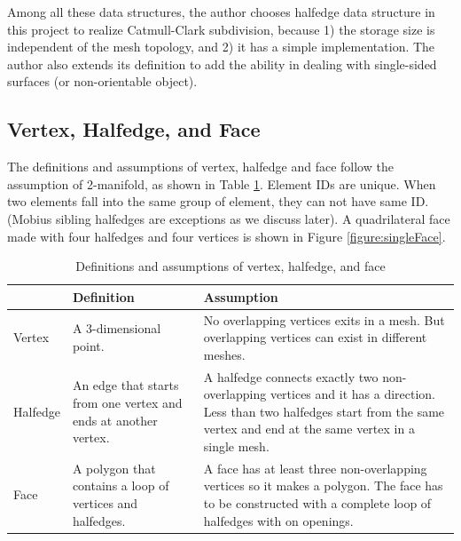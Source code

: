 \documentclass[12pt]{article}
\begin{document}
Among all these data structures, the author chooses halfedge data structure in this project to realize Catmull-Clark subdivision, because 1) the storage size is independent of the mesh topology, and 2) it has a simple implementation. The author also extends its definition to add the ability in dealing with single-sided surfaces (or non-orientable object).

\subsection{Vertex, Halfedge, and Face}

The definitions and assumptions of vertex, halfedge and face follow the assumption of 2-manifold, as shown in Table \ref{table:vhfdef}. Element IDs are unique. When two elements fall into the same group of element, they can not have same ID. (Mobius sibling halfedges are exceptions as we discuss later). A quadrilateral face made with four halfedges and four vertices is shown in Figure \ref{figure:singleFace}.

\begin{table}[h]
\centering
\begin{tabular}{| l | p{} | p{}|}

\hline
		&	Definition	& Assumption	\\
\hline
Vertex	&	A 3-dimensional point.		&	No overlapping vertices exits in a mesh. But overlapping vertices can exist in different meshes.\\
\hline
Halfedge	&	An edge that starts from one vertex and ends at another vertex. & A halfedge connects exactly two non-overlapping vertices and it has a direction. 
Less than two halfedges start from the same vertex and end at the same vertex in a single mesh.\\
\hline
Face		&	A polygon that contains a loop of vertices and halfedges.	& A face has at least three non-overlapping vertices so it makes a polygon. The face has to be constructed with a complete loop of halfedges with on openings.\\
\hline
\end{tabular}
\caption{Definitions and assumptions of vertex, halfedge, and face} 
\label{table:vhfdef}
\end{table}
\end{document}
